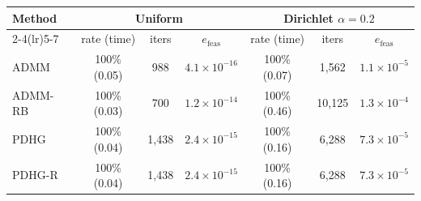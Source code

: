 \begin{tabular}{lcccccc}
\toprule
Method & \multicolumn{3}{c}{Uniform} & \multicolumn{3}{c}{Dirichlet $\alpha=0.2$} \\
\cmidrule(lr){2-4}\cmidrule(lr){5-7}
 & rate (time) & iters & $e_{\mathrm{feas}}$ & rate (time) & iters & $e_{\mathrm{feas}}$ \\
\midrule
ADMM & 100\% (0.05) & 988 & $4.1{\times}10^{-16}$ & 100\% (0.07) & 1,562 & $1.1{\times}10^{-5}$ \\
ADMM-RB & 100\% (0.03) & 700 & $1.2{\times}10^{-14}$ & 100\% (0.46) & 10,125 & $1.3{\times}10^{-4}$ \\
PDHG & 100\% (0.04) & 1,438 & $2.4{\times}10^{-15}$ & 100\% (0.16) & 6,288 & $7.3{\times}10^{-5}$ \\
PDHG-R & 100\% (0.04) & 1,438 & $2.4{\times}10^{-15}$ & 100\% (0.16) & 6,288 & $7.3{\times}10^{-5}$ \\
\bottomrule
\end{tabular}